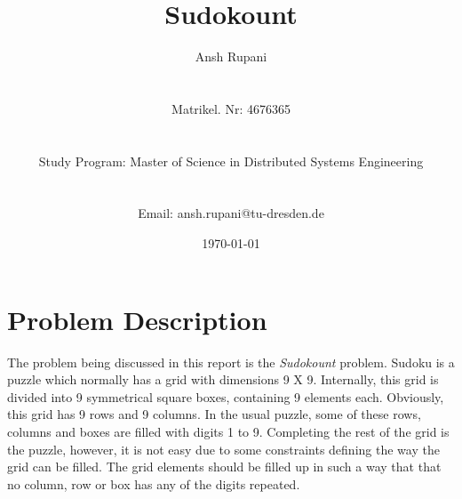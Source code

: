 \documentclass[a4paper,10pt,twoside]{article}
\title{Sudokount}
\author{Ansh Rupani \\ \\ \\Matrikel. Nr: 4676365 \\ \\ \\Study Program: Master of Science in Distributed Systems Engineering \\ \\ \\Email: ansh.rupani@tu-dresden.de}
\date{\today}
\begin{document}
\maketitle


%

\pagebreak

\tableofcontents

\newpage

\section{Problem Description}

The problem being discussed in this report is the \textit{Sudokount} problem. Sudoku is a puzzle which normally has a grid with dimensions 9 X 9. Internally, this grid is divided into 9 symmetrical square boxes, containing 9 elements each. Obviously, this grid has 9 rows and 9 columns. In the usual puzzle, some of these rows, columns and boxes are filled with digits 1 to 9. Completing the rest of the grid is the puzzle, however, it is not easy due to some constraints defining the way the grid can be filled. The grid elements should be filled up in such a way that that no column, row or box has any of the digits repeated.
\end{document}
